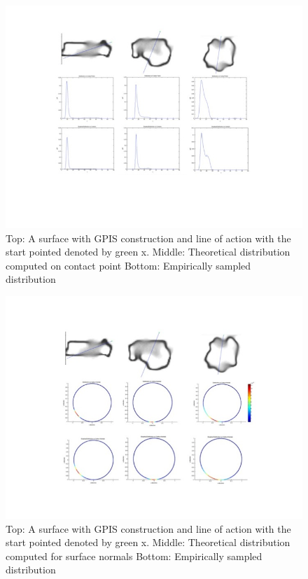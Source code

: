 \documentclass[letterpaper, 10 pt, conference]{ieeeconf}  %
\begin{document}
\begin{figure}[h]
\centering
\includegraphics[scale = 0.3]{figures/Slide07.jpg}
\caption{Top: A surface with GPIS construction and line of action with the start pointed denoted by green x.
Middle: Theoretical distribution computed on contact point
Bottom: Empirically sampled distribution}
\vspace*{-10pt}
\label{fig:Contact_Dist}
\end{figure}

\begin{figure}[ht!]
\centering
\includegraphics[scale = 0.3]{figures/Slide08.jpg}
\caption{Top: A surface with GPIS construction and line of action with the start pointed denoted by green x.
Middle: Theoretical distribution computed for surface normals
Bottom: Empirically sampled distribution}
\vspace*{-10pt}
\label{fig:Normal_Dist}
\end{figure}
\end{document}
